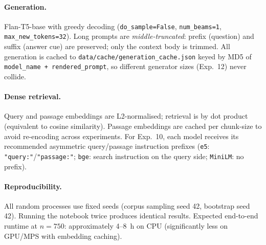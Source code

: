\documentclass{article}
\begin{document}
\paragraph{Generation.}
Flan-T5-base with greedy decoding (\texttt{do\_sample=False},
\texttt{num\_beams=1}, \texttt{max\_new\_tokens=32}).
Long prompts are \emph{middle-truncated}: prefix (question) and suffix
(answer cue) are preserved; only the context body is trimmed.
All generation is cached to
\texttt{data/cache/generation\_cache.json} keyed by MD5 of
\texttt{model\_name + rendered\_prompt}, so different generator sizes
(Exp.~12) never collide.

\paragraph{Dense retrieval.}
Query and passage embeddings are L2-normalised; retrieval is by
dot product (equivalent to cosine similarity).
Passage embeddings are cached per chunk-size to avoid re-encoding across
experiments.
For Exp.~10, each model receives its recommended asymmetric
query/passage instruction prefixes
(\texttt{e5}: \texttt{"query:"}/\texttt{"passage:"}; \texttt{bge}: search
instruction on the query side; \texttt{MiniLM}: no prefix).

\paragraph{Reproducibility.}
All random processes use fixed seeds (corpus sampling seed 42,
bootstrap seed 42).
Running the notebook twice produces identical results.
Expected end-to-end runtime at $n\!=\!750$: approximately 4--8~h on CPU
(significantly less on GPU/MPS with embedding caching).
\end{document}
